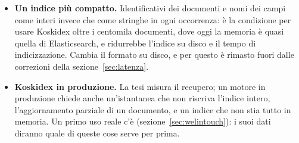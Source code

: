 \begin{itemize}
        costa 12-15~ms per passata; più accumulatori nel prodotto scalare la
        accorcerebbero, a prezzo di punteggi diversi nelle ultime cifre, e oltre
        qualche centinaio di migliaia di documenti servirebbe un indice
        approssimato.
  \item \textbf{Un indice più compatto.} Identificativi dei documenti e nomi dei
        campi come interi invece che come stringhe in ogni occorrenza: è la
        condizione per usare Koskidex oltre i centomila documenti, dove oggi la
        memoria è quasi quella di Elasticsearch, e ridurrebbe l'indice su disco
        e il tempo di indicizzazione. Cambia il formato su disco, e per questo è
        rimasto fuori dalle correzioni della sezione~\ref{sec:latenza}.
  \item \textbf{Koskidex in produzione.} La tesi misura il recupero; un motore in
        produzione chiede anche un'istantanea che non riscriva l'indice intero,
        l'aggiornamento parziale di un documento, e un indice che non stia tutto
        in memoria. Un primo uso reale c'è (sezione~\ref{sec:welintouch}): i
        suoi dati diranno quale di queste cose serve per prima.
\end{itemize}
